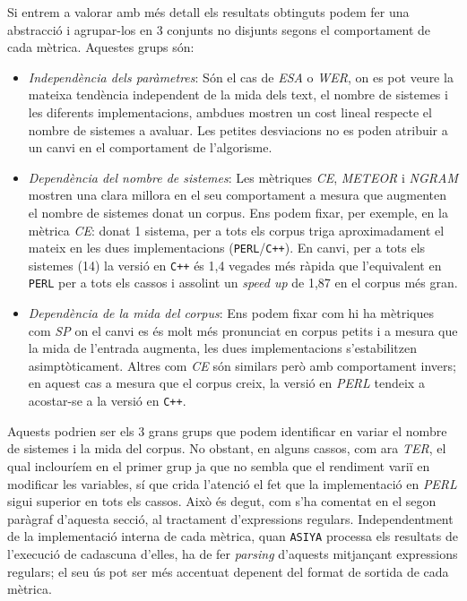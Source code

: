\documentclass[11pt,a4paper]{article}
\begin{document}
Si entrem a valorar amb més detall els resultats obtinguts podem fer una abstracció i agrupar-los en 3 conjunts no disjunts segons el comportament de cada mètrica. Aquestes grups són: 

\begin{itemize}
\item \textit{Independència dels paràmetres}: Són el cas de \textit{ESA} o \textit{WER}, on es pot veure la mateixa tendència independent de la mida dels text, el nombre de sistemes i les diferents implementacions, ambdues mostren un cost lineal respecte el nombre de sistemes a avaluar. Les petites desviacions no es poden atribuir a un canvi en el comportament de l'algorisme.


\item \textit{Dependència del nombre de sistemes}: Les mètriques \textit{CE}, \textit{METEOR} i \textit{NGRAM} mostren una clara millora en el seu comportament a mesura que augmenten el nombre de sistemes donat un corpus. Ens podem fixar, per exemple, en la mètrica \textit{CE}: donat 1 sistema, per a tots els corpus triga aproximadament el mateix en les dues implementacions (\texttt{PERL}/\texttt{C++}). En canvi, per a tots els sistemes (14) la versió en \texttt{C++} és 1,4 vegades més ràpida que l'equivalent en \texttt{PERL} per a tots els cassos i assolint un \textit{speed up} de 1,87 en el corpus més gran.


\item \textit{Dependència de la mida del corpus}: Ens podem fixar com hi ha mètriques com \textit{SP} on el canvi es és molt més pronunciat en corpus petits i a mesura que la mida de l'entrada augmenta, les dues implementacions s'estabilitzen asimptòticament. Altres com \textit{CE} són similars però amb comportament invers; en aquest cas a mesura que el corpus creix, la versió en \textit{PERL} tendeix a acostar-se a la versió en \texttt{C++}.

\end{itemize}

Aquests podrien ser els 3 grans grups que podem identificar en variar el nombre de sistemes i la mida del corpus. No obstant, en alguns cassos, com ara \textit{TER}, el qual inclouríem  en el primer grup ja que no sembla que el rendiment variï en modificar les variables, sí que crida l'atenció el fet que la implementació en \textit{PERL} sigui superior en tots els cassos. Això és degut, com s'ha comentat en el segon paràgraf d'aquesta secció, al tractament d'expressions regulars. Independentment de la implementació interna de cada mètrica, quan \texttt{ASIYA} processa els resultats de l'execució de cadascuna d'elles, ha de fer \textit{parsing} d'aquests mitjançant expressions regulars; el seu ús pot ser més accentuat depenent del format de sortida de cada mètrica.
\end{document}
